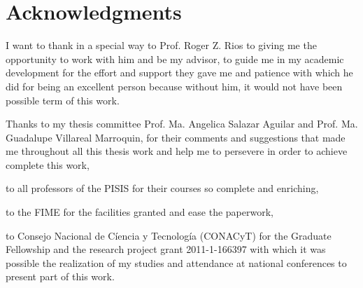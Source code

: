 
\chapter{Acknowledgments}

I want to thank in a special way
to Prof. Roger Z. Rios
to giving me the opportunity to work with him
and be my advisor,
to guide me in my academic development
for the effort and support they gave me
and patience with which he did
for being an excellent person
because without him,
it would not have been possible term of this work.

Thanks to my thesis committee
Prof. Ma. Angelica Salazar Aguilar
and Prof. Ma. Guadalupe Villareal Marroquin,
for their comments and suggestions
that made me throughout all this thesis work
and help me to persevere in order
to achieve complete this work,

to all professors of the PISIS
for their courses so complete and enriching,

to the FIME
for the facilities granted
and ease the paperwork,

to Consejo Nacional de Cíencia y Tecnología (CONACyT)
for the Graduate Fellowship
and the research project grant 2011-1-166397
with which it was possible the realization of my studies
and attendance at national conferences
to present part of this work.
